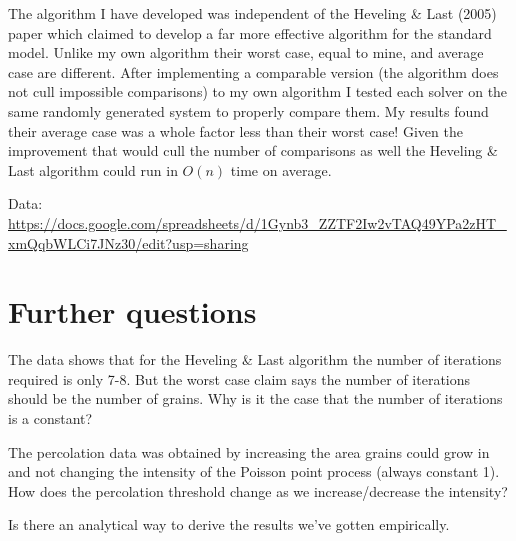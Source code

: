 \documentclass{article}
\begin{document}
The algorithm I have developed was independent of the Heveling \& Last (2005)
paper which claimed to develop a far more effective algorithm for the standard
model. Unlike my own algorithm their worst case, equal to mine,
and average case are different.
After implementing a comparable version (the algorithm does not cull impossible
comparisons) to my own algorithm I tested each solver
on the same randomly generated system to properly compare them. My results found
their average case was a whole factor less than their worst case! Given the
improvement that would cull the number of comparisons as well the 
Heveling \& Last algorithm could run in $O(n)$ time on average.

Data:
\url{https://docs.google.com/spreadsheets/d/1Gynb3_ZZTF2Iw2vTAQ49YPa2zHT_xmQqbWLCi7JNz30/edit?usp=sharing}

\section{Further questions}
The data shows that for the Heveling \& Last algorithm the number of iterations
required is only 7-8. But the worst case claim says the number of iterations should
be the number of grains. Why is it the case that the number of iterations is
a constant?

The percolation data was obtained by increasing the area grains could grow in and
not changing the intensity of the Poisson point process (always constant 1).
How does the percolation threshold change as we increase/decrease the intensity?

Is there an analytical way to derive the results we've gotten empirically.
\end{document}
